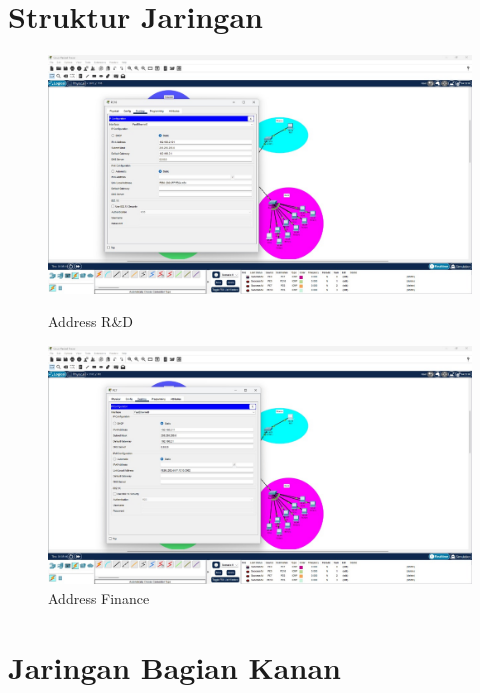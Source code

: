 \newpage
\section{Struktur Jaringan}

\begin{figure}[H]
  \centering
  \begin{minipage}[t]{0.48\textwidth}
    \centering
    \includegraphics[width=\linewidth]{P1/img/R&DIP.jpeg}
    \caption{Address R\&D}
    \label{fig:rnd}
  \end{minipage}
  \hfill
  \begin{minipage}[t]{0.48\textwidth}
    \centering
    \includegraphics[width=\linewidth]{P1/img/FinIP.jpeg}
    \caption{Address Finance}
    \label{fig:finance}
  \end{minipage}
\end{figure}

\newpage
\section{Jaringan Bagian Kanan}

